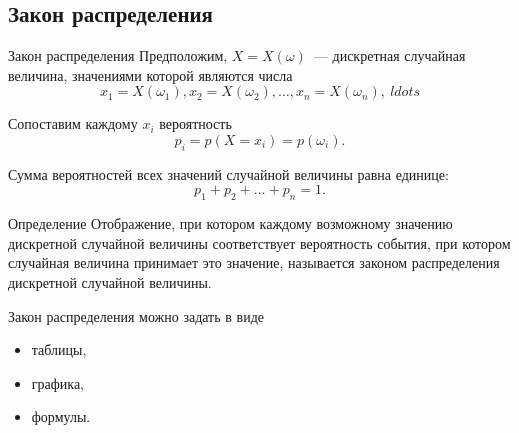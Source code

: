\documentclass[unicode,11pt,notheorems,xcolor=table]{beamer}
\begin{document}
\subsection{Закон распределения}

\begin{frame}{Закон распределения}{}
    Предположим, $X = X(\omega)$~--- дискретная случайная величина, значениями которой являются числа
    $$
        x_1 = X(\omega_1), x_2= X(\omega_2),\ldots, x_n = X(\omega_n),\ ldots
    $$
    
    Сопоставим каждому $x_i$ вероятность 
    $$
    p_i = p(X=x_i) = p(\omega_i).
    $$ 

    Сумма вероятностей всех значений случайной величины равна единице:
    $$
        p_1 + p_ 2 + \ldots + p_n = 1.
    $$
    
    \begin{block}{Определение}
        Отображение, при котором каждому возможному значению дискретной случайной величины соответствует вероятность события, при котором случайная величина принимает это значение, называется \alert{законом распределения дискретной случайной величины.}
    \end{block}
    
    Закон распределения можно задать в виде
    \begin{itemize}
        \item таблицы, 
        \item графика, 
        \item формулы.
    \end{itemize}
\end{frame}
\end{document}
